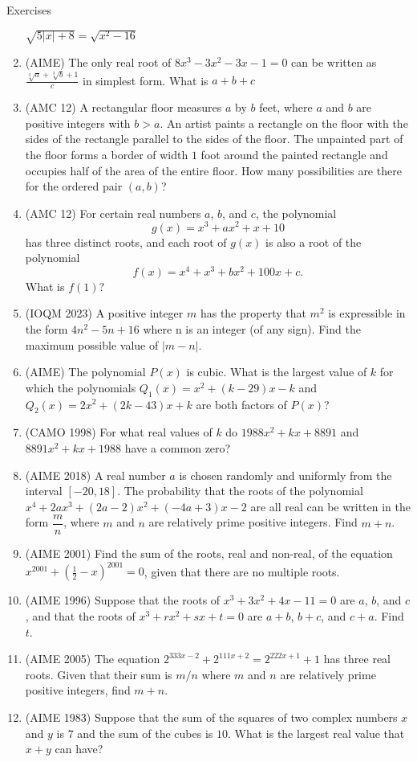 \begin{xcb}{Exercises}
\begin{enumerate}
$\sqrt{5|x|+8}=\sqrt{x^2-16}$
\item (AIME) The only real root of $8x^3-3x^2-3x-1=0$ can be written as $\frac{\sqrt[3]{a}+\sqrt[3]{b}+1}{c}$ in simplest form. What is $a+b+c$
\item (AMC 12) A rectangular floor measures $a$ by $b$ feet, where $a$ and $b$ are positive integers with $b > a$. An artist paints a rectangle on the floor with the sides of the rectangle parallel to the sides of the floor. The unpainted part of the floor forms a border of width $1$ foot around the painted rectangle and occupies half of the area of the entire floor. How many possibilities are there for the ordered pair $(a,b)$? 
\item(AMC 12) For certain real numbers $a$, $b$, and $c$, the polynomial\[g(x) = x^3 + ax^2 + x + 10\]has three distinct roots, and each root of $g(x)$ is also a root of the polynomial\[f(x) = x^4 + x^3 + bx^2 + 100x + c.\]What is $f(1)$?
\item(IOQM 2023) A positive integer $m$ has the property that $m^2$ is expressible in the form $4n^2-5n+16$ where n is an integer (of any sign). Find the maximum possible value of $|m - n|$.
\item (AIME) The polynomial $P(x)$ is cubic. What is the largest value of $k$ for which the polynomials $Q_1(x) = x^2 + (k-29)x - k$ and $Q_2(x) = 2x^2+ (2k-43)x + k$ are both factors of $P(x)$?
\item(CAMO 1998) For what real values of $k$ do $1988x^2+kx+8891$ and $8891x^2 + kx + 1988$ have a common zero?
\item (AIME 2018) A real number $a$ is chosen randomly and uniformly from the interval $[-20, 18]$. The probability that the roots of the polynomial $x^4 + 2ax^3 + (2a - 2)x^2 + (-4a + 3)x - 2$ are all real can be written in the form $\dfrac{m}{n}$, where $m$ and $n$ are relatively prime positive integers. Find $m + n$.
\item (AIME 2001) Find the sum of the roots, real and non-real, of the equation $x^{2001}+\left(\frac 12-x\right)^{2001}=0$, given that there are no multiple roots.
\item (AIME 1996) Suppose that the roots of $x^3+3x^2+4x-11=0$ are $a$, $b$, and $c$, and that the roots of $x^3+rx^2+sx+t=0$ are $a+b$, $b+c$, and $c+a$. Find $t$.
\item (AIME 2005) The equation $2^{333x-2} + 2^{111x+2} = 2^{222x+1} + 1$ has three real roots. Given that their sum is $m/n$ where $m$ and $n$ are relatively prime positive integers, find $m+n.$
\item (AIME 1983) Suppose that the sum of the squares of two complex numbers $x$ and $y$ is $7$ and the sum of the cubes is $10$. What is the largest real value that $x + y$ can have?

\end{enumerate}
\end{xcb}
